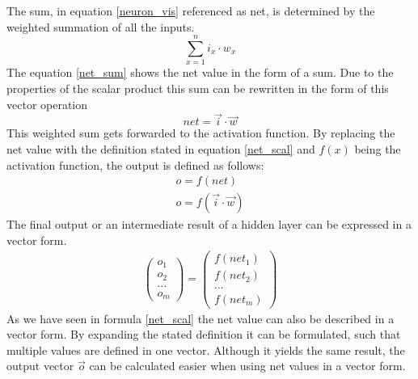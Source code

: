 \documentclass[12pt]{article}
\begin{document}
The sum, in equation \ref{neuron_vis} referenced as net, is determined by the weighted summation of all the  \glspl{input}. 
\begin{equation}
  \sum_{x = 1}^{n} i_{x} \cdot w_{x}  
  \label{net_sum}
\end{equation}
The equation \ref{net_sum} shows the \gls{net value} in the form of a sum.
Due to the properties of the \gls{scalar product} this sum can be rewritten in the form of this \gls{vector} operation
\begin{equation}
net = \vec{i} \cdot \vec{w}
\label{net_scal}
\end{equation}
This weighted sum gets forwarded to the \gls{activation function}. By replacing the \gls{net value} with the definition stated in equation \ref{net_scal}  and $f(x)$ being the \gls{activation function}, the output is defined as follows:
\begin{equation}
\begin{gathered}
       o = f(net)\\
    o = f(\vec{i} \cdot \vec{w}) 
\end{gathered}
\end{equation}
The final output or an intermediate result of a \gls{hidden layer} can be expressed in a vector form.
\begin{equation}
\begin{gathered}
      \begin{pmatrix}
o_{1}\\ 
o_{2}\\ 
...\\ 
o_{m}
\end{pmatrix} = \begin{pmatrix}
f(net_{1})\\ 
f(net_{2})\\ 
...\\ 
f(net_{m})
\end{pmatrix}
\end{gathered}
\end{equation}
As we have seen in formula \ref{net_scal} the \gls{net value} can also be described in a vector form. By expanding the stated definition it can be formulated, such that multiple values are defined in one \gls{vector}. Although it yields the same result, the output \gls{vector} $\vec{o}$ can be calculated easier when using \glspl{net value} in a vector form.
\end{document}
